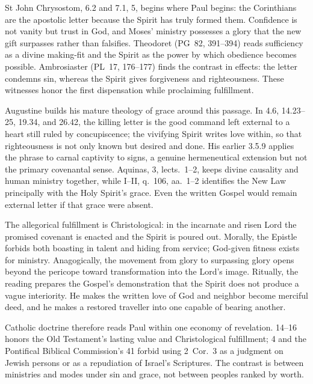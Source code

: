 St John Chrysostom,  6.2 and 7.1, 5, begins
where Paul begins: the Corinthians are the apostolic letter because the Spirit
has truly formed them. Confidence is not vanity but trust in God, and Moses'
ministry possesses a glory that the new gift surpasses rather than falsifies.
Theodoret (PG~82, 391--394) reads sufficiency as a divine making-fit and the
Spirit as the power by which obedience becomes possible. Ambrosiaster
(PL~17, 176--177) finds the contrast in effects: the letter condemns sin,
whereas the Spirit gives forgiveness and righteousness. These witnesses honor
the first dispensation while proclaiming fulfillment.

Augustine builds his mature theology of grace around this passage. In
 4.6, 14.23--25, 19.34, and 26.42, the killing
letter is the good command left external to a heart still ruled by
concupiscence; the vivifying Spirit writes love within, so that righteousness
is not only known but desired and done. His earlier  3.5.9 applies the phrase to carnal captivity to signs, a genuine
hermeneutical extension but not the primary covenantal sense. Aquinas,
 3, lects.~1--2, keeps divine causality and human
ministry together, while  I--II, q.~106, aa.~1--2 identifies the New
Law principally with the Holy Spirit's grace. Even the written Gospel would
remain external letter if that grace were absent.

The allegorical fulfillment is Christological: in the incarnate and risen
Lord the promised covenant is enacted and the Spirit is poured out. Morally,
the Epistle forbids both boasting in talent and hiding from service; God-given
fitness exists for ministry. Anagogically, the movement from glory to
surpassing glory opens beyond the pericope toward transformation into the
Lord's image. Ritually, the reading prepares the Gospel's demonstration that
the Spirit does not produce a vague interiority. He makes the written love of
God and neighbor become merciful deed, and he makes a restored traveller into
one capable of bearing another.

Catholic doctrine therefore reads Paul within one economy of revelation.
 14--16 honors the Old Testament's lasting value and
Christological fulfillment;  4 and the Pontifical Biblical
Commission's  41 forbid using
2~Cor.~3 as a judgment on Jewish persons or as a repudiation of Israel's
Scriptures. The contrast is between ministries and modes under sin and grace,
not between peoples ranked by worth.

